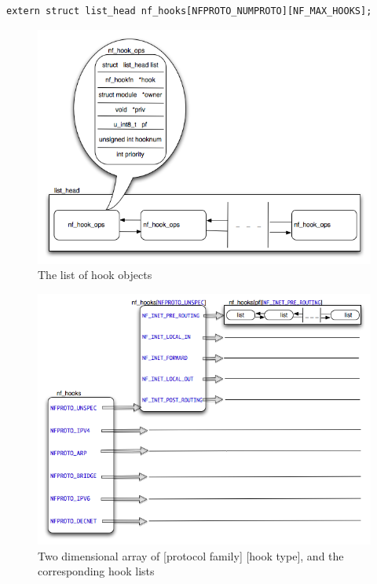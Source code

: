 \documentclass[a4paper,10pt]{article}
\begin{document}
\begin{lstlisting}
extern struct list_head nf_hooks[NFPROTO_NUMPROTO][NF_MAX_HOOKS];
\end{lstlisting}

\begin{figure}[H]
  \centering
  \includegraphics[totalheight=0.4\textheight]{images/hook_objects_list.png}
  \caption{The list of hook objects}\label{fig:hook_objects_list}
\end{figure}

\begin{figure}[H]
  \centering
  \includegraphics[totalheight=0.4\textheight]{images/nf_hooks_list.png}
  \caption{Two dimensional array of [protocol family] [hook type], and the corresponding hook lists}\label{fig:nf_hooks_list}
\end{figure}
\end{document}
